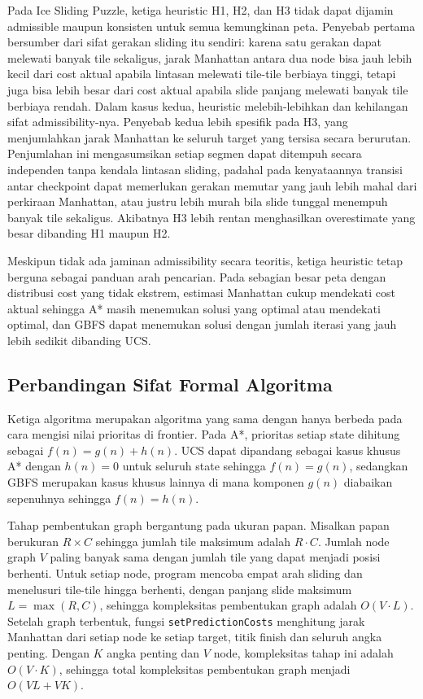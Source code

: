 \documentclass[a4paper,11pt]{article}
\begin{document}
Pada Ice Sliding Puzzle, ketiga heuristic H1, H2, dan H3 tidak dapat dijamin admissible maupun konsisten untuk semua kemungkinan peta. Penyebab pertama bersumber dari sifat gerakan sliding itu sendiri: karena satu gerakan dapat melewati banyak tile sekaligus, jarak Manhattan antara dua node bisa jauh lebih kecil dari cost aktual apabila lintasan melewati tile-tile berbiaya tinggi, tetapi juga bisa lebih besar dari cost aktual apabila slide panjang melewati banyak tile berbiaya rendah. Dalam kasus kedua, heuristic melebih-lebihkan dan kehilangan sifat admissibility-nya. Penyebab kedua lebih spesifik pada H3, yang menjumlahkan jarak Manhattan ke seluruh target yang tersisa secara berurutan. Penjumlahan ini mengasumsikan setiap segmen dapat ditempuh secara independen tanpa kendala lintasan sliding, padahal pada kenyataannya transisi antar checkpoint dapat memerlukan gerakan memutar yang jauh lebih mahal dari perkiraan Manhattan, atau justru lebih murah bila slide tunggal menempuh banyak tile sekaligus. Akibatnya H3 lebih rentan menghasilkan overestimate yang besar dibanding H1 maupun H2.

Meskipun tidak ada jaminan admissibility secara teoritis, ketiga heuristic tetap berguna sebagai panduan arah pencarian. Pada sebagian besar peta dengan distribusi cost yang tidak ekstrem, estimasi Manhattan cukup mendekati cost aktual sehingga A* masih menemukan solusi yang optimal atau mendekati optimal, dan GBFS dapat menemukan solusi dengan jumlah iterasi yang jauh lebih sedikit dibanding UCS.

\subsection{Perbandingan Sifat Formal Algoritma}
\label{subsec:comparison}

Ketiga algoritma merupakan algoritma yang sama dengan hanya berbeda pada cara mengisi nilai prioritas di frontier. Pada A*, prioritas setiap state dihitung sebagai $f(n) = g(n) + h(n)$. UCS dapat dipandang sebagai kasus khusus A* dengan $h(n) = 0$ untuk seluruh state sehingga $f(n) = g(n)$, sedangkan GBFS merupakan kasus khusus lainnya di mana komponen $g(n)$ diabaikan sepenuhnya sehingga $f(n) = h(n)$.

Tahap pembentukan graph bergantung pada ukuran papan. Misalkan papan berukuran $R \times C$ sehingga jumlah tile maksimum adalah $R \cdot C$. Jumlah node graph $V$ paling banyak sama dengan jumlah tile yang dapat menjadi posisi berhenti. Untuk setiap node, program mencoba empat arah sliding dan menelusuri tile-tile hingga berhenti, dengan panjang slide maksimum $L = \max(R, C)$, sehingga kompleksitas pembentukan graph adalah $O(V \cdot L)$. Setelah graph terbentuk, fungsi \texttt{setPredictionCosts} menghitung jarak Manhattan dari setiap node ke setiap target, titik finish dan seluruh angka penting. Dengan $K$ angka penting dan $V$ node, kompleksitas tahap ini adalah $O(V \cdot K)$, sehingga total kompleksitas pembentukan graph menjadi $O(VL + VK)$.
\end{document}
